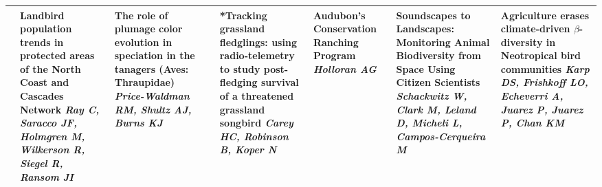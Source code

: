 \begin{tabular}{|x{0.85cm}|x{2.85cm}|x{2.85cm}|x{2.85cm}|x{2.85cm}|a{2.85cm}|a{2.85cm}|a{2.85cm}|}
&Landbird population trends in protected areas of the North Coast and Cascades Network \newline \newline \textit{Ray C, Saracco JF, Holmgren M, Wilkerson R, Siegel R, Ransom JI} & The role of plumage color evolution in speciation in the tanagers (Aves: Thraupidae) \newline \newline \textit{Price-Waldman RM, Shultz AJ, Burns KJ} &  \newline \newline \textit{} & *Tracking grassland fledglings: using radio-telemetry to study post-fledging survival of a threatened grassland songbird \newline \newline \textit{Carey HC, Robinson B, Koper N} & Audubon's Conservation Ranching Program \newline \newline \textit{Holloran AG} & Soundscapes to Landscapes: Monitoring Animal Biodiversity from Space Using Citizen Scientists \newline \newline \textit{Schackwitz W, Clark M, Leland D, Micheli L, Campos-Cerqueira M} & Agriculture erases climate-driven $\beta$-diversity in Neotropical bird communities \newline \newline \textit{Karp DS, Frishkoff LO, Echeverri A, Juarez P, Juarez P, Chan KM}\\
\hline

\end{tabular}

